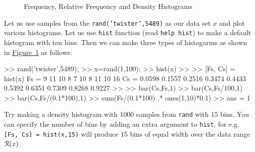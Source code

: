 \begin{figure}[htpb]
\caption{Frequency, Relative Frequency and Density Histograms\label{F:FreqRelFreqDensityHistograms100Unif01MT5489}}
\centering   {}
\end{figure}

\begin{labwork}\label{LW:hist}
Let us use samples from the {\tt rand('twister',5489)} as our data set $x$ and plot various histograms.  Let us use {\tt hist} function (read {\tt help hist}) to make a default histogram with ten bins.  Then we can make three types of histogarms as shown in \hyperref[F:FreqRelFreqDensityHistograms100Unif01MT5489]{Figure~\ref*{F:FreqRelFreqDensityHistograms100Unif01MT5489}}  as follows:
\begin{VrbM}
>> rand('twister',5489);
>> x=rand(1,100); %
>> hist(x) %
>> %
>> [Fs, Cs] = hist(x) %
Fs =
     9    11    10     8     7    10     8    11    10    16
Cs =
    0.0598    0.1557    0.2516    0.3474    0.4433    0.5392    0.6351    0.7309    0.8268    0.9227
>> %
>> bar(Cs,Fs,1) %
>> bar(Cs,Fs/100,1) %
>> bar(Cs,Fs/(0.1*100),1) %
>> sum(Fs/(0.1*100) .* ones(1,10)*0.1) %
>> ans = 1
\end{VrbM}
Try making a density histogram with 1000 samples from {\tt rand} with 15 bins.  You can specify the number of bins by adding an extra argument to {\tt hist}, for e.g. {\tt [Fs, Cs] = hist(x,15)} will produce 15 bins of equal width over the data range $\mathcal{R}(x)$.
\end{labwork}

